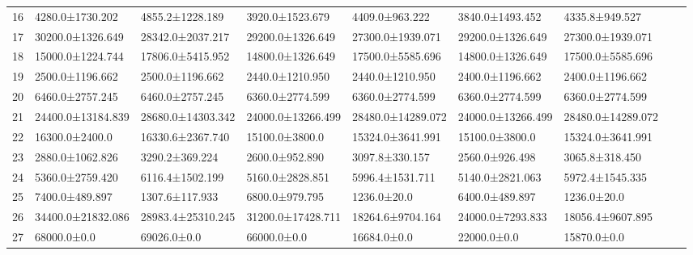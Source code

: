 \begin{tabular}{|r|l|l|l|l|l|l|l|l|}
  16 & 4280.0±1730.202 & 4855.2±1228.189 & 3920.0±1523.679 & 4409.0±963.222 & 3840.0±1493.452 & 4335.8±949.527 \\ 
  17 & 30200.0±1326.649 & 28342.0±2037.217 & 29200.0±1326.649 & 27300.0±1939.071 & 29200.0±1326.649 & 27300.0±1939.071 \\ 
  18 & 15000.0±1224.744 & 17806.0±5415.952 & 14800.0±1326.649 & 17500.0±5585.696 & 14800.0±1326.649 & 17500.0±5585.696 \\ 
  19 & 2500.0±1196.662 & 2500.0±1196.662 & 2440.0±1210.950 & 2440.0±1210.950 & 2400.0±1196.662 & 2400.0±1196.662 \\ 
  20 & 6460.0±2757.245 & 6460.0±2757.245 & 6360.0±2774.599 & 6360.0±2774.599 & 6360.0±2774.599 & 6360.0±2774.599 \\ 
  21 & 24400.0±13184.839 & 28680.0±14303.342 & 24000.0±13266.499 & 28480.0±14289.072 & 24000.0±13266.499 & 28480.0±14289.072 \\ 
  22 & 16300.0±2400.0 & 16330.6±2367.740 & 15100.0±3800.0 & 15324.0±3641.991 & 15100.0±3800.0 & 15324.0±3641.991 \\ 
  23 & 2880.0±1062.826 & 3290.2±369.224 & 2600.0±952.890 & 3097.8±330.157 & 2560.0±926.498 & 3065.8±318.450 \\ 
  24 & 5360.0±2759.420 & 6116.4±1502.199 & 5160.0±2828.851 & 5996.4±1531.711 & 5140.0±2821.063 & 5972.4±1545.335 \\ 
  25 & 7400.0±489.897 & 1307.6±117.933 & 6800.0±979.795 & 1236.0±20.0 & 6400.0±489.897 & 1236.0±20.0 \\ 
  26 & 34400.0±21832.086 & 28983.4±25310.245 & 31200.0±17428.711 & 18264.6±9704.164 & 24000.0±7293.833 & 18056.4±9607.895 \\ 
  27 & 68000.0±0.0 & 69026.0±0.0 & 66000.0±0.0 & 16684.0±0.0 & 22000.0±0.0 & 15870.0±0.0 \\ 
\end{tabular}
